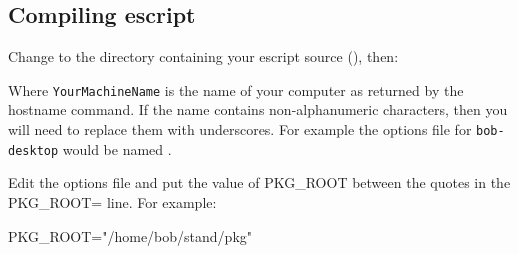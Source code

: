 % 
% 
% 
% 
% 
% 
% 

\subsection{Compiling escript}\label{sec:compileescriptlinux}

Change to the directory containing your escript source (), then:

Where \texttt{YourMachineName} is the name of your computer as returned by the hostname command.
If the name contains non-alphanumeric characters, then you will need to replace them with underscores.
For example the options file for \texttt{bob-desktop} would be named .

Edit the options file and put the value of PKG_ROOT between the quotes in the PKG_ROOT= line.
For example:
\begin{shellCode}
PKG_ROOT="/home/bob/stand/pkg"
\end{shellCode}

